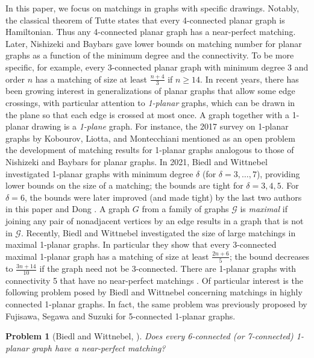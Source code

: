 \documentclass[12pt,a4paper]{article}
\newtheorem{prob}{Problem}[section]
\begin{document}
In this paper, we focus on matchings in graphs with specific drawings.  Notably, the classical theorem of Tutte \cite{MR0081471} states that every 4-connected planar graph is Hamiltonian. Thus any 4-connected planar graph  has a near-perfect matching. Later, Nishizeki and Baybars \cite{MR0548625} gave lower bounds on matching number  for planar graphs as a function of the minimum degree and the connectivity. To be more specific, for example, every 3-connected planar graph with minimum degree 3 and order $n$ has a matching of size at least $\frac{n+4}{3}$ if $n\ge 14$.
In recent years, there has been growing interest in generalizations of planar graphs that allow some edge crossings, with particular attention to \emph{1-planar} graphs, which can be drawn in the plane so that each edge is crossed at most once. A graph together with a 1-planar drawing is a \emph{1-plane} graph. For instance, the 2017 survey on 1-planar graphs by Kobourov, Liotta, and Montecchiani \cite[p.~65]{MR3697129} mentioned as an open problem the development of matching results for 1-planar graphs analogous to those of Nishizeki and Baybars for planar graphs. In 2021, Biedl and Wittnebel \cite{MR4429150} investigated 1-planar graphs with minimum degree $\delta$ (for $\delta = 3, \ldots, 7$), providing lower bounds on the size of a matching; the bounds are tight for $\delta = 3, 4, 5$.  For $\delta=6$, the bounds were later improved (and made tight) by the last two authors in this paper and Dong \cite{MR4504132}.  
A graph $G$ from a family of graphs $\mathcal{G}$ is \emph{maximal} if joining any pair of nonadjacent vertices by an edge results in a graph that is not in $\mathcal{G}$.
 Recently, Biedl and Wittnebel \cite{MR4813988}   investigated the size of large matchings in maximal 1-planar graphs.  In particular they show that every 3-connected maximal 1-planar graph has a matching of size at least $\frac{2 n+6}{5}$; the bound decreases to $\frac{3 n+14}{10}$ if the graph need not be 3-connected. 
There are 1-planar graphs with connectivity 5 that have no near-perfect matchings \cite{Biedl}. 
Of particular interest is the following problem posed by Biedl and Wittnebel \cite{MR4429150} concerning matchings in highly connected 1-planar graphs. In fact,  the same problem was previously proposed by Fujisawa, Segawa and Suzuki \cite{MR3846896} for 5-connected 1-planar graphs.
\begin{prob}[Biedl and Wittnebel, \cite{MR4429150}]\label{prob:0}
Does every 6-connected (or 7-connected)  1-planar graph have a  near-perfect matching?
\end{prob}
\end{document}
